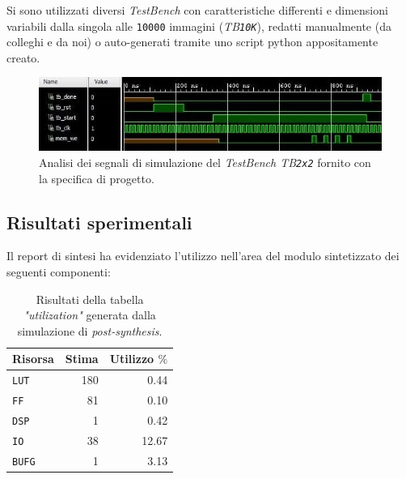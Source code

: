 \documentclass{article}
\begin{document}
Si sono utilizzati diversi \emph{TestBench} con caratteristiche differenti e dimensioni variabili dalla singola alle \texttt{10000} immagini (\emph{TB\texttt{10K}}), redatti manualmente (da colleghi e da noi) o auto-generati tramite uno script python appositamente creato.
\vspace{0,2cm}

\begin{figure}[ht]
    \centering
    \includegraphics[scale=0.8]{2x2.jpg}
    \caption{Analisi dei segnali di simulazione del \emph{TestBench TB\texttt{2x2}} fornito con la specifica di progetto.}
\end{figure}
\vspace{0,2cm}

\pagebreak

\subsection{Risultati sperimentali}
Il report di sintesi ha evidenziato l’utilizzo nell’area del modulo sintetizzato dei seguenti componenti:

\begin{table}[ht]
    \centering
    \small
    \def\arraystretch{1.3} %
    \caption{Risultati della tabella \emph{"utilization"} generata dalla simulazione di \emph{post-synthesis}.}
    \begin{tabular}[width=4cm]{|| l | r | r ||}
        \hline
        Risorsa       & Stima & Utilizzo $\%$\footnotemark \\
        \hline \hline
        \texttt{LUT}  & 180   & 0.44                       \\ \hline
        \texttt{FF}   & 81    & 0.10                       \\ \hline
        \texttt{DSP}  & 1     & 0.42                       \\ \hline
        \texttt{IO}   & 38    & 12.67                      \\ \hline
        \texttt{BUFG} & 1     & 3.13                       \\ \hline
    \end{tabular}
\end{table}
\vspace{0,2cm}
\end{document}
